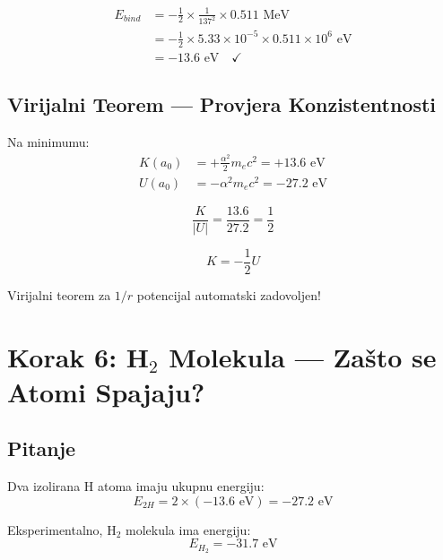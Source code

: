 \documentclass[12pt,a4paper]{article}
\begin{document}
\begin{numerical}
\begin{align*}
E_{bind} &= -\frac{1}{2} \times \frac{1}{137^2} \times 0.511 \text{ MeV} \\
&= -\frac{1}{2} \times 5.33 \times 10^{-5} \times 0.511 \times 10^6 \text{ eV} \\
&= -13.6 \text{ eV} \quad \checkmark
\end{align*}
\end{numerical}

\subsection{Virijalni Teorem — Provjera Konzistentnosti}

Na minimumu:
\begin{align}
K(a_0) &= +\frac{\alpha^2}{2} m_e c^2 = +13.6 \text{ eV} \\
U(a_0) &= -\alpha^2 m_e c^2 = -27.2 \text{ eV}
\end{align}

\begin{equation}
\frac{K}{|U|} = \frac{13.6}{27.2} = \frac{1}{2}
\end{equation}

\begin{keyresult}
\begin{equation}
\boxed{K = -\frac{1}{2}U}
\end{equation}

Virijalni teorem za $1/r$ potencijal automatski zadovoljen!
\end{keyresult}

\section{Korak 6: H$_2$ Molekula — Zašto se Atomi Spajaju?}

\subsection{Pitanje}

Dva izolirana H atoma imaju ukupnu energiju:
\begin{equation}
E_{2H} = 2 \times (-13.6 \text{ eV}) = -27.2 \text{ eV}
\end{equation}

Eksperimentalno, H$_2$ molekula ima energiju:
\begin{equation}
E_{H_2} = -31.7 \text{ eV}
\end{equation}
\end{document}
